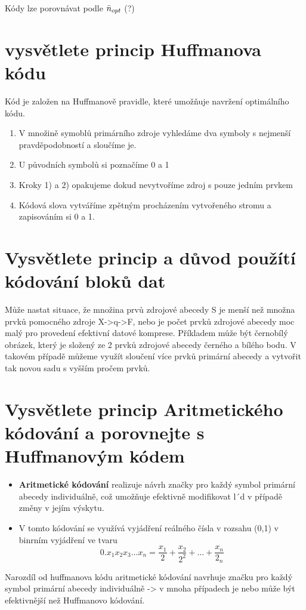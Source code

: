 Kódy lze porovnávat podle $\Bar{n}_{opt}$ (?)

\section{vysvětlete princip Huffmanova kódu}
Kód je založen na Huffmanově pravidle, které umožňuje navržení optimálního kódu.

\begin{enumerate}
    \item V množině symoblů primárního zdroje vyhledáme dva symboly s nejmenší pravděpodobností a sloučíme je.
    \item U původních symbolů si poznačíme 0 a 1
    \item Kroky 1) a 2) opakujeme dokud nevytvoříme zdroj s pouze jedním prvkem
    \item Kódová slova vytváříme zpětným procházením vytvořeného stromu a zapisováním si 0 a 1.
\end{enumerate}

\section{Vysvětlete princip a důvod použítí kódování bloků dat}
Může nastat situace, že množina prvů zdrojové abecedy S je menší než množna prvků pomocného zdroje X->q->F, nebo je počet prvků zdrojové abecedy moc malý pro provedení efektivní datové komprese.
Příkladem může být černobílý obrázek, který je složený ze 2 prvků zdrojové abecedy černého a bílého bodu.
V takovém případě můžeme využít sloučení více prvků primární abecedy a vytvořit tak novou sadu s vyšším pročem prvků.

\section{Vysvětlete princip Aritmetického kódování a porovnejte s Huffmanovým kódem}
\begin{itemize}
    \item \textbf{Aritmetické kódování} realizuje návrh značky pro každý symbol primární abecedy individuálně, což umožňuje efektivně modifikovat l´d v případě změny v jejím výskytu.
    \item V tomto kódování se využívá vyjádření reálného čísla v rozsahu (0,1) v binrním vyjádření ve tvaru
    $$0.x_1x_2x_3\dots x_n=\frac{x_1}{2}+\frac{x_2}{2^2}+\dots+\frac{x_n}{2_n}$$
\end{itemize}
Narozdíl od huffmanova kódu aritmetické kódování navrhuje značku pro každý symbol primární abecedy individuálně -> v mnoha případech je nebo může být efektivnější než Huffmanovo kódování.
